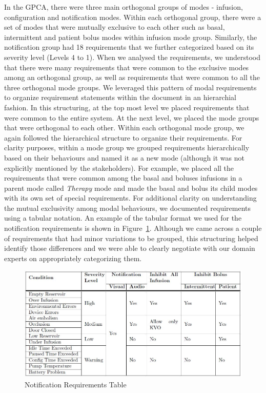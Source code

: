 In the GPCA, there were three main orthogonal groups of modes - infusion, configuration and notification modes. Within each orthogonal group, there were a set of modes that were mutually exclusive to each other such as basal, intermittent and patient bolus modes within infusion mode group. Similarly, the notification group had 18 requirements that we further categorized based on its severity level (Levels 4 to 1). When we analysed the requirements, we understood that there were many requirements that were common to the exclusive modes among an orthogonal group, as well as requirements that were common to all the three orthogonal mode groups. We leveraged this pattern of modal requirements to organize requirement statements within the document in an hierarchial fashion. In this structuring, at the top most level we placed requirements that were common to the entire system. At the next level, we placed the mode groups that were orthogonal to each other. Within each orthogonal mode group, we again followed the hierarchical structure to organize their requirements. For clarity purposes, within a mode group we grouped requirements hierarchically based on their behaviours and named it as a new mode (although it was not explicitly mentioned by the stakeholders). For example, we placed all the requirements that were common among the basal and boluses infusions in a parent mode called \emph{Therapy} mode and made the basal and bolus its child modes with its own set of special requirements. For additional clarity on understanding the mutual exclusivity among modal behaviours, we documented requirements using a tabular notation. An example of the tabular format we used for the notification requirements is shown in Figure~\ref{fig:gpca-alarm}. Although we came across a couple of requirements that had minor variations to be grouped, this structuring helped identify those differences and we were able to clearly negotiate with our domain experts on appropriately categorizing them.

 \begin{figure}[h!]
    \centering
    \includegraphics[width=\columnwidth]{images/alarm.jpg}
    \caption{Notification Requirements Table}
    \label{fig:gpca-alarm}
 \end{figure}


